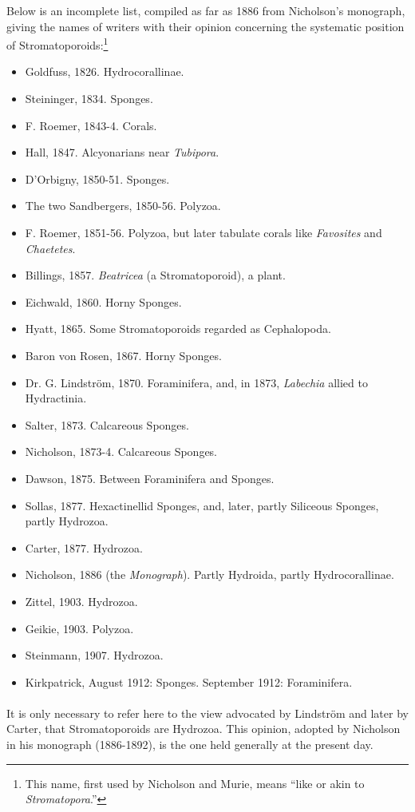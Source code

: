 \documentclass[a4paper, 12pt, oneside]{article}
\begin{document}
Below is an incomplete list, compiled as far as 1886 from Nicholson's monograph, giving the names of writers with their opinion concerning the systematic position of Stromatoporoids:\footnote{This name, first used by Nicholson and Murie, means ``like or akin to \emph{Stromatopora}.''}
\begin{itemize}
    \item Goldfuss, 1826. Hydrocorallinae.
    \item Steininger, 1834. Sponges.
    \item F. Roemer, 1843-4. Corals.
    \item Hall, 1847. Alcyonarians near \emph{Tubipora}.
    \item D'Orbigny, 1850-51. Sponges.
    \item The two Sandbergers, 1850-56. Polyzoa.
    \item F. Roemer, 1851-56. Polyzoa, but later tabulate corals like \emph{Favosites} and \emph{Chaetetes}.
    \item Billings, 1857. \emph{Beatricea} (a Stromatoporoid), a plant.
    \item Eichwald, 1860. Horny Sponges.
    \item Hyatt, 1865. Some Stromatoporoids regarded as Cephalopoda.
    \item Baron von Rosen, 1867. Horny Sponges.
    \item Dr. G. Lindström, 1870. Foraminifera, and, in 1873, \emph{Labechia} allied to Hydractinia.
    \item Salter, 1873. Calcareous Sponges.
    \item Nicholson, 1873-4. Calcareous Sponges.
    \item Dawson, 1875. Between Foraminifera and Sponges.
    \item Sollas, 1877. Hexactinellid Sponges, and, later, partly Siliceous Sponges, partly Hydrozoa.
    \item Carter, 1877. Hydrozoa.
    \item Nicholson, 1886 (the \emph{Monograph}). Partly Hydroida, partly Hydrocorallinae.
    \item Zittel, 1903. Hydrozoa.
    \item Geikie, 1903. Polyzoa.
    \item Steinmann, 1907. Hydrozoa.
    \item Kirkpatrick, August 1912: Sponges. September 1912: Foraminifera.
\end{itemize}
\paragraph{}
It is only necessary to refer here to the view advocated by Lindström and later by Carter, that Stromatoporoids are Hydrozoa. This opinion, adopted by Nicholson in his monograph (1886-1892), is the one held generally at the present day.
\end{document}
